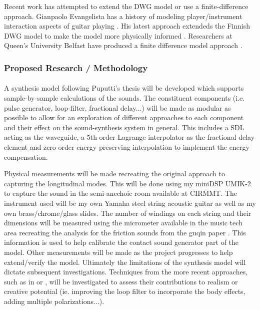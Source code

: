 \documentclass[12pt]{article}
\begin{document}
Recent work has attempted to extend the DWG model or use a finite-difference approach. Gianpaolo Evangelista has a history of modeling player/instrument interaction aspects of guitar playing \cite{evangelista_physical_2011} \cite{evangelista_playerinstrument_2010}. His latest approach extendeds the Finnish DWG model to make the model more physically informed \cite{evangelista_physical_2012}. Researchers at Queen’s University Belfast have produced a finite difference model approach \cite{bhanuprakash_finite_2020}.

\subsubsection*{Proposed Research / Methodology}
\paragraph{}
A synthesis model following Puputti's thesis will be developed which supports sample-by-sample calculations of the sounds. The constituent components (i.e. pulse generator, loop-filter, fractional delay...) will be made as modular as possible to allow for an exploration of different approaches to each component and their effect on the sound-synthesis system in general. This includes a SDL acting as the waveguide, a 5th-order Lagrange interpolator as the fractional delay element and zero-order energy-preserving interpolation to implement the energy compensation.

Physical measurements will be made recreating the original approach to capturing the longitudinal modes. This will be done using my miniDSP UMIK-2 to capture the sound in the semi-anechoic room available at CIRMMT. The instrument used will be my own Yamaha steel string acoustic guitar as well as my own brass/chrome/glass slides. The number of windings on each string and their dimensions will be measured using the micrometer available in the music tech area recreating the analysis for the friction sounds from the guqin paper \cite{penttinen_model-based_2006}. This information is used to help calibrate the contact sound generator part of the model. Other measurements will be made as the project progresses to help extend/verify the model. Ultimately the limitations of the synthesis model will dictate subsequent investigations. Techniques from the more recent approaches, such as in \cite{bhanuprakash_finite_2020} or \cite{evangelista_physical_2012}, will be investigated to assess their contributions to realism or creative potential (ie. improving the loop filter to incorporate the body effects, adding multiple polarizations...). 
\end{document}
